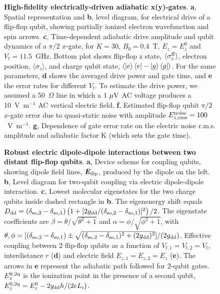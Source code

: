 \documentclass[aps,prb,superscriptaddress,nobibnotes,preprint]{revtex4-1}%
\begin{document}
\begin{figure}
	\centering
	\caption{\textbf{High-fidelity electrically-driven adiabatic x(y)-gates}. \textbf{a}, Spatial representation and \textbf{b}, level diagram, for electrical drive of a flip-flop qubit, showing partially ionized electron wavefunction and spin arrows.
		\textbf{c}, Time-dependent adiabatic drive amplitude and qubit dynamics of a $\pi/2$ $x$-gate, for $K=30$, $B_0=0.4$~T, $E_z=E_z^0$ and $V_t=11.5$~GHz. Bottom plot shows flip-flop z state, $\langle\sigma_z^{\rm ff}\rangle$, electron position, $\langle\sigma_z\rangle$, and charge qubit state, $\langle\ket{e}\bra{e}-\ket{g}\bra{g}\rangle$.
		For the same parameters, \textbf{d} shows the averaged drive power and gate time, and \textbf{e} the error rates for different $V_t$. To estimate the drive power, we assumed a 50~$\Omega$ line in which a $1~{\rm \mu V}$ AC voltage produces a 10~V~m$^{-1}$ AC vertical electric field.
		\textbf{f}, Estimated flip-flop qubit $\pi/2$ $x$-gate error due to quasi-static noise with amplitude $E_{z, \rm rms}^{\rm noise}=100$~V~m$^{-1}$.
		\textbf{g}, Dependence of gate error rate on the electric noise r.m.s. amplitude and adiabatic factor K (which sets the gate time).}
	\label{fig:1-qubit}
\end{figure}\clearpage

\begin{figure}
	\centering
	\caption{\textbf{Robust electric dipole-dipole interactions between two distant flip-flop qubits}.
		\textbf{a}, Device scheme for coupling qubits, showing dipole field lines, $\textit{\textbf{E}}_{\rm dip}$, produced by the dipole on the left.
		\textbf{b}, Level diagram for two-qubit coupling via electric dipole-dipole interaction.
		\textbf{c}, Lowest molecular eigenstates for the two charge qubits inside dashed rectangle in \textbf{b}. The eigenenergy shift equals $D_{\rm dd}=(\delta_{\rm so,2}-\delta_{\rm so,1})\left(1+[2g_{\rm dd}/(\delta_{\rm so,2}-\delta_{\rm so,1})]^2\right)/2$. The eigenstate coefficients are $\beta=\theta/\sqrt{\theta^2+1}$ and $\alpha=\phi/\sqrt{\phi^2+1}$, with $\theta,\phi=[(\delta_{\rm so,2}-\delta_{\rm so,1})\pm\sqrt{(\delta_{\rm so,2}-\delta_{\rm so,1})^2+(2g_{\rm dd})^2}]/(2g_{\rm dd})$.
		Effective coupling between 2 flip-flop qubits as a function of $V_{t,1}=V_{t,2}=V_t$, interdistance $r$ (\textbf{d}) and electric field $E_{z,1}=E_{z,2}=E_z$ (\textbf{e}). The arrows in \textbf{e} represent the adiabatic path followed for 2-qubit gates. $E_z^{\rm 0,2q}$ is the ionization point in the presence of a second qubit, $E_z^{\rm 0,2q}=E_z^0-2g_{\rm dd}h/(2eL_i)$.}
	\label{fig:2-qubit}
\end{figure}\clearpage
\end{document}
